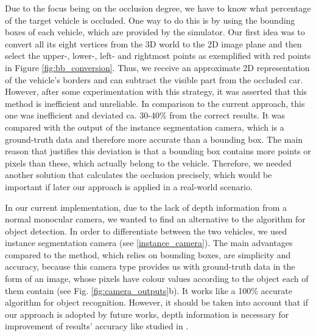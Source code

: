 Due to the focus being on the occlusion degree, we have to know what percentage of the target vehicle is occluded. One way to do this is by using the bounding boxes of each vehicle, which are provided by the simulator. Our first idea was to convert all its eight vertices from the 3D world to the 2D image plane and then select the upper-, lower-,  left- and rightmost points as exemplified with red points in Figure \ref{fig:bb_conversion}. Thus, we receive an approximate 2D representation of the vehicle's borders and can subtract the visible part from the occluded car. However, after some experimentation with this strategy, it was asserted that this method is inefficient and unreliable. In comparison to the current approach, this one was inefficient and deviated ca. 30-40\% from the correct results. It was compared with the output of the instance segmentation camera, which is a ground-truth data and therefore more accurate than a bounding box. The main reason that justifies this deviation is that a bounding box contains more points or pixels than these, which actually belong to the vehicle. Therefore, we needed another solution that calculates the occlusion precisely, which would be important if later our approach is applied in a real-world scenario.

In our current implementation, due to the lack of depth information from a normal monocular camera, we wanted to find an alternative to the algorithm for object detection. In order to differentiate between the two vehicles, we used instance segmentation camera (see \ref{instance_camera}). The main advantages compared to the method, which relies on bounding boxes, are simplicity and accuracy, because this camera type provides us with ground-truth data in the form of an image, whose pixels have colour values according to the object each of them contain (see Fig. \ref{fig:camera_outputs}b). It works like a 100\% accurate algorithm for object recognition. However, it should be taken into account that if our approach is adopted by future works, depth information is necessary for improvement of results' accuracy like studied in \cite{instance_rgb_combo}.


